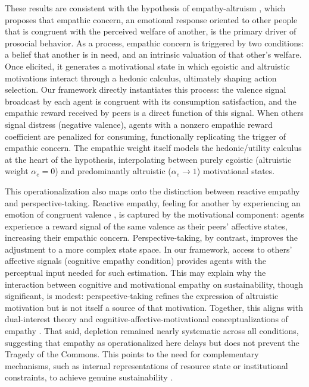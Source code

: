 These results are consistent with the hypothesis of empathy-altruism \cite{batson1997perspective,Batson01041991,batson2022empathy}, which proposes that empathic concern, an emotional response oriented to other people that is congruent with the perceived welfare of another, is the primary driver of prosocial behavior. As a process, empathic concern is triggered by two conditions: a belief that another is in need, and an intrinsic valuation of that other's welfare. Once elicited, it generates a motivational state in which egoistic and altruistic motivations interact through a hedonic calculus, ultimately shaping action selection. Our framework directly instantiates this process: the valence signal broadcast by each agent is congruent with its consumption satisfaction, and the empathic reward received by peers is a direct function of this signal. When others signal distress (negative valence), agents with a nonzero empathic reward coefficient are penalized for consuming, functionally replicating the trigger of empathic concern. The empathic weight itself models the hedonic/utility calculus at the heart of the hypothesis, interpolating between purely egoistic (altruistic weight $\alpha_e = 0$) and predominantly altruistic ($\alpha_e \rightarrow 1$) motivational states.

This operationalization also maps onto the distinction between reactive empathy and perspective-taking. Reactive empathy, feeling for another by experiencing an emotion of congruent valence \cite{batson1997perspective}, is captured by the motivational component: agents experience a reward signal of the same valence as their peers' affective states, increasing their empathic concern. Perspective-taking, by contrast, improves the adjustment to a more complex state space. In our framework, access to others' affective signals (cognitive empathy condition) provides agents with the perceptual input needed for such estimation. This may explain why the interaction between cognitive and motivational empathy on sustainability, though significant, is modest: perspective-taking refines the expression of altruistic motivation but is not itself a source of that motivation. Together, this aligns with dual-interest theory \cite{lynneTheoreticalFoundationEmpathy2016} and cognitive-affective-motivational conceptualizations of empathy \cite{decetyNeuralPathwaysDevelopment2015,dewaalMammalianEmpathyBehavioural2017}. That said, depletion remained nearly systematic across all conditions, suggesting that empathy as operationalized here delays but does not prevent the Tragedy of the Commons. This points to the need for complementary mechanisms, such as internal representations of resource state or institutional constraints, to achieve genuine sustainability \cite{ostromGeneralFrameworkAnalyzing2009,vanlangeHowWeCan2008}.

